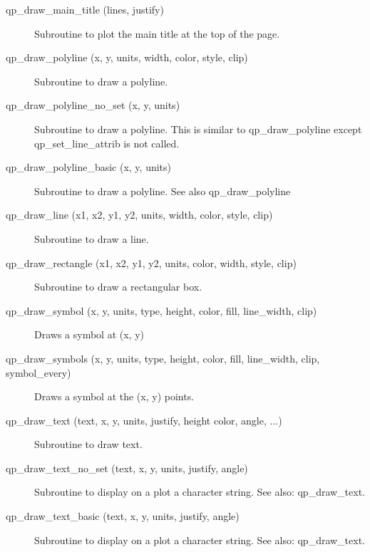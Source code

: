 \begin{description}
\item[qp_draw_main_title (lines, justify)] \Newline 
     Subroutine to plot the main title at the top of the page.

\item[qp_draw_polyline (x, y, units, width, color, style, clip)] \Newline 
     Subroutine to draw a polyline.

\item[qp_draw_polyline_no_set (x, y, units)] \Newline 
Subroutine to draw a polyline.
This is similar to qp_draw_polyline except qp_set_line_attrib is not called.

\item[qp_draw_polyline_basic (x, y, units) ] \Newline 
     Subroutine to draw a polyline. See also qp_draw_polyline

\item[qp_draw_line (x1, x2, y1, y2, units, width, color, style, clip)] \Newline 
     Subroutine to draw a line.

\item[qp_draw_rectangle (x1, x2, y1, y2, units, color, width,
                                             style, clip) ] \Newline 
     Subroutine to draw a rectangular box.

\item[qp_draw_symbol (x, y, units, type, height, color, 
                                fill, line_width, clip) ] \Newline 
     Draws a symbol at (x, y) 

\item[qp_draw_symbols (x, y, units, type, height, color,
            fill, line_width, clip, symbol_every) ] \Newline 
     Draws a symbol at the (x, y) points. 

\item[qp_draw_text (text, x, y, units, justify, height
        color, angle, ...) ] \Newline 
     Subroutine to draw text.

\item[qp_draw_text_no_set (text, x, y, units, justify, angle)] \Newline 
Subroutine to display on a plot a character string.
See also: qp_draw_text.

\item[qp_draw_text_basic (text, x, y, units, justify, angle)] \Newline 
     Subroutine to display on a plot a character string.
     See also: qp_draw_text.


\end{description}
